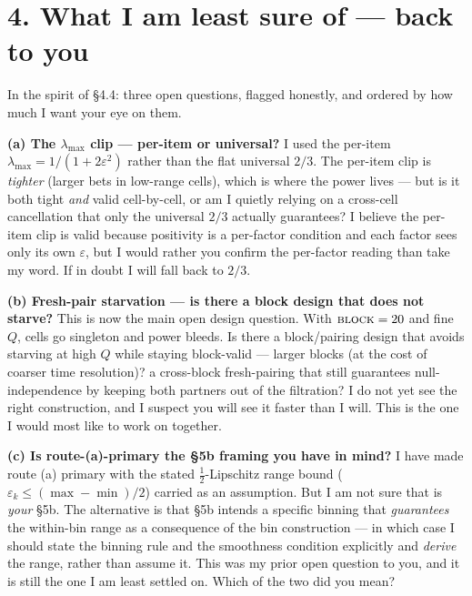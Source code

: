 \documentclass[11pt,a4paper]{article}
\begin{document}
\section*{4. What I am least sure of --- back to you}

\noindent In the spirit of \S4.4: three open questions, flagged honestly, and
ordered by how much I want your eye on them.

\medskip
\noindent\textbf{(a) The $\lambda_{\max}$ clip --- per-item or universal?} I used
the per-item $\lambda_{\max} = 1/(1 + 2\varepsilon^2)$ rather than the flat
universal $2/3$. The per-item clip is \emph{tighter} (larger bets in low-range
cells), which is where the power lives --- but is it both tight \emph{and} valid
cell-by-cell, or am I quietly relying on a cross-cell cancellation that only the
universal $2/3$ actually guarantees? I believe the per-item clip is valid because
positivity is a per-factor condition and each factor sees only its own
$\varepsilon$, but I would rather you confirm the per-factor reading than take my
word. If in doubt I will fall back to $2/3$.

\medskip
\noindent\textbf{(b) Fresh-pair starvation --- is there a block design that does
not starve?} This is now the main open design question. With $\textsc{block} = 20$
and fine $Q$, cells go singleton and power bleeds. Is there a block/pairing design
that avoids starving at high $Q$ while staying block-valid --- larger blocks (at
the cost of coarser time resolution)? a cross-block fresh-pairing that still
guarantees null-independence by keeping both partners out of the filtration? I do
not yet see the right construction, and I suspect you will see it faster than I
will. This is the one I would most like to work on together.

\medskip
\noindent\textbf{(c) Is route-(a)-primary the \S5b framing you have in mind?}
I have made route (a) primary with the stated $\tfrac12$-Lipschitz range bound
($\varepsilon_k \le (\max-\min)/2$) carried as an assumption. But I am not sure
that is \emph{your} \S5b. The alternative is that \S5b intends a specific binning
that \emph{guarantees} the within-bin range as a consequence of the bin
construction --- in which case I should state the binning rule and the smoothness
condition explicitly and \emph{derive} the range, rather than assume it. This was
my prior open question to you, and it is still the one I am least settled on.
Which of the two did you mean?
\end{document}
